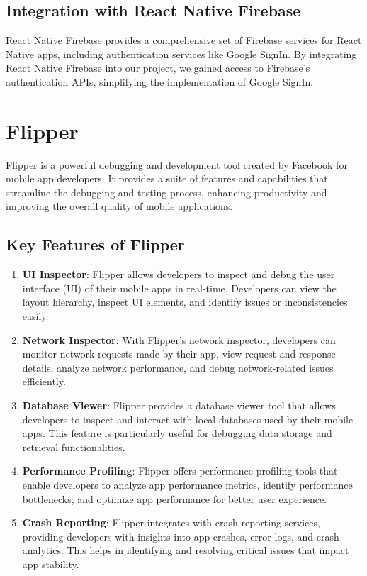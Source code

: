 \subsection{Integration with React Native Firebase}

React Native Firebase provides a comprehensive set of Firebase services for React Native apps, including authentication services like Google SignIn. By integrating React Native Firebase into our project, we gained access to Firebase's authentication APIs, simplifying the implementation of Google SignIn.

\section{Flipper}

Flipper is a powerful debugging and development tool created by Facebook for mobile app developers. It provides a suite of features and capabilities that streamline the debugging and testing process, enhancing productivity and improving the overall quality of mobile applications.

\subsection{Key Features of Flipper}

\begin{enumerate}
  \item \textbf{UI Inspector}: Flipper allows developers to inspect and debug the user interface (UI) of their mobile apps in real-time. Developers can view the layout hierarchy, inspect UI elements, and identify issues or inconsistencies easily.
  
  \item \textbf{Network Inspector}: With Flipper's network inspector, developers can monitor network requests made by their app, view request and response details, analyze network performance, and debug network-related issues efficiently.
  
  \item \textbf{Database Viewer}: Flipper provides a database viewer tool that allows developers to inspect and interact with local databases used by their mobile apps. This feature is particularly useful for debugging data storage and retrieval functionalities.
  
  \item \textbf{Performance Profiling}: Flipper offers performance profiling tools that enable developers to analyze app performance metrics, identify performance bottlenecks, and optimize app performance for better user experience.
  
  \item \textbf{Crash Reporting}: Flipper integrates with crash reporting services, providing developers with insights into app crashes, error logs, and crash analytics. This helps in identifying and resolving critical issues that impact app stability.
\end{enumerate}



